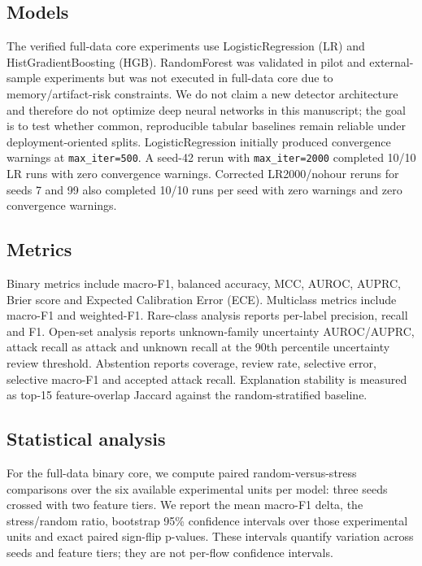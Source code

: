 \documentclass[11pt,a4paper]{article}
\begin{document}
\subsection{Models}

The verified full-data core experiments use LogisticRegression (LR) and HistGradientBoosting (HGB). RandomForest was validated in pilot and external-sample experiments but was not executed in full-data core due to memory/artifact-risk constraints. We do not claim a new detector architecture and therefore do not optimize deep neural networks in this manuscript; the goal is to test whether common, reproducible tabular baselines remain reliable under deployment-oriented splits. LogisticRegression initially produced convergence warnings at \texttt{max\_iter=500}. A seed-42 rerun with \texttt{max\_iter=2000} completed 10/10 LR runs with zero convergence warnings. Corrected LR2000/nohour reruns for seeds 7 and 99 also completed 10/10 runs per seed with zero warnings and zero convergence warnings.

\subsection{Metrics}

Binary metrics include macro-F1, balanced accuracy, MCC, AUROC, AUPRC, Brier score and Expected Calibration Error (ECE). Multiclass metrics include macro-F1 and weighted-F1. Rare-class analysis reports per-label precision, recall and F1. Open-set analysis reports unknown-family uncertainty AUROC/AUPRC, attack recall as attack and unknown recall at the 90th percentile uncertainty review threshold. Abstention reports coverage, review rate, selective error, selective macro-F1 and accepted attack recall. Explanation stability is measured as top-15 feature-overlap Jaccard against the random-stratified baseline.

\subsection{Statistical analysis}

For the full-data binary core, we compute paired random-versus-stress comparisons over the six available experimental units per model: three seeds crossed with two feature tiers. We report the mean macro-F1 delta, the stress/random ratio, bootstrap 95\% confidence intervals over those experimental units and exact paired sign-flip p-values. These intervals quantify variation across seeds and feature tiers; they are not per-flow confidence intervals.
\end{document}
